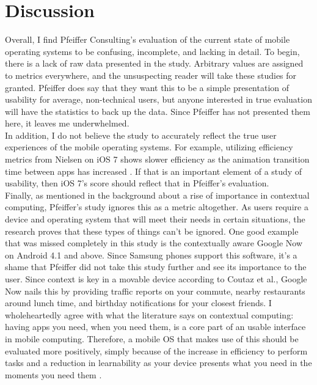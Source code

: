 \documentclass[11pt]{article}
\begin{document}
\section{Discussion}
Overall, I find Pfeiffer Consulting's evaluation of the current state of mobile operating systems to be confusing, incomplete, and lacking in detail. To begin, there is a lack of raw data presented in the study. Arbitrary values are assigned to metrics everywhere, and the unsuspecting reader will take these studies for granted. Pfeiffer does say that they want this to be a simple presentation of usability for average, non-technical users, but anyone interested in true evaluation will have the statistics to back up the data. Since Pfeiffer has not presented them here, it leaves me underwhelmed. \\
\indent In addition, I do not believe the study to accurately reflect the true user experiences of the mobile operating systems. For example, utilizing efficiency metrics from Nielsen on iOS 7 shows slower efficiency as the animation transition time between apps has increased \cite{Nielsen}. If that is an important element of a study of usability, then iOS 7's score should reflect that in Pfeiffer's evaluation. \\
\indent Finally, as mentioned in the background about a rise of importance in contextual computing, Pfeiffer's study ignores this as a metric altogether. As users require a device and operating system that will meet their needs in certain situations, the research proves that these types of things can't be ignored. One good example that was missed completely in this study is the contextually aware Google Now on Android 4.1 and above. Since Samsung phones support this software, it's a shame that Pfeiffer did not take this study further and see its importance to the user. Since context is key in a movable device according to Coutaz et al., Google Now nails this by providing traffic reports on your commute, nearby restaurants around lunch time, and birthday notifications for your closest friends. \cite{GoogleNow} I wholeheartedly agree with what the literature says on contextual computing: having apps you need, when you need them, is a core part of an usable interface in mobile computing. Therefore, a mobile OS that makes use of this should be evaluated more positively, simply because of the increase in efficiency to perform tasks and a reduction in learnability as your device presents what you need in the moments you need them \cite{Nielsen}.
\end{document}
